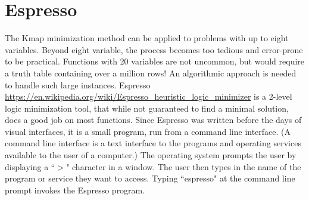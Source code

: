 \section{Espresso}
The Kmap minimization method can be applied to problems with up to
eight variables.  Beyond eight variable, the process becomes too tedious and error-prone to
be practical.  Functions with 20 variables are not uncommon, but 
would require a truth table containing over a million rows!  An 
algorithmic approach is needed to handle such large instances.  
Espresso \url{https://en.wikipedia.org/wiki/Espresso_heuristic_logic_minimizer}
is a 2-level logic minimization tool, that while not 
guaranteed to find a minimal solution, does a good job on most 
functions.  Since Espresso was written before the days 
of visual interfaces, it is a small program, run from a command line interface.  
(A command line interface
is a text interface to the programs and operating services
available to the user of a computer.) The operating system prompts
the user by displaying a ``$>$" character in a window. The user
then types in the name of the program or service they want to 
access.  Typing ``espresso" at the command
line prompt invokes the Espresso program.

